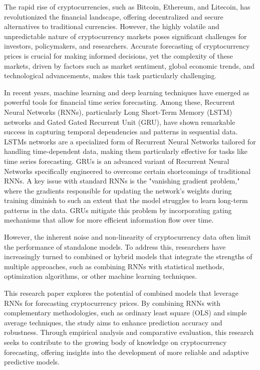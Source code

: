 \documentclass{dsfe}
\begin{document}
The rapid rise of cryptocurrencies, such as Bitcoin, Ethereum, and Litecoin, has revolutionized the financial landscape, offering decentralized and secure alternatives to traditional currencies. However, the highly volatile and unpredictable nature of cryptocurrency markets poses significant challenges for investors, policymakers, and researchers. Accurate forecasting of cryptocurrency prices is crucial for making informed decisions, yet the complexity of these markets, driven by factors such as market sentiment, global economic trends, and technological advancements, makes this task particularly challenging.

In recent years, machine learning and deep learning techniques have emerged as powerful tools for financial time series forecasting. Among these, Recurrent Neural Networks (RNNs), particularly Long Short-Term Memory (LSTM) networks and Gated Gated Recurrent Unit (GRU), have shown remarkable success in capturing temporal dependencies and patterns in sequential data. LSTMs networks are a specialized form of Recurrent Neural Networks tailored for handling time-dependent data, making them particularly effective for tasks like time series forecasting. GRUs is an advanced variant of Recurrent Neural Networks specifically engineered to overcome certain shortcomings of traditional RNNs. A key issue with standard RNNs is the "vanishing gradient problem," where the gradients responsible for updating the network's weights during training diminish to such an extent that the model struggles to learn long-term patterns in the data. GRUs mitigate this problem by incorporating gating mechanisms that allow for more efficient information flow over time.

However, the inherent noise and non-linearity of cryptocurrency data often limit the performance of standalone models. To address this, researchers have increasingly turned to combined or hybrid models that integrate the strengths of multiple approaches, such as combining RNNs with statistical methods, optimization algorithms, or other machine learning techniques.

This research paper explores the potential of combined models that leverage RNNs for forecasting cryptocurrency prices. By combining RNNs with complementary methodologies, such as ordinary least square (OLS) and simple average techniques, the study aims to enhance prediction accuracy and robustness. Through empirical analysis and comparative evaluation, this research seeks to contribute to the growing body of knowledge on cryptocurrency forecasting, offering insights into the development of more reliable and adaptive predictive models.
\end{document}
